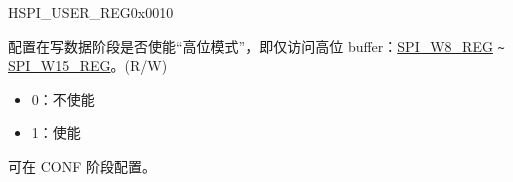 \begin{register}{H}{SPI\_USER\_REG}{0x0010}
\begin{regdesc}
\begin{reglist}
\label{fielddesc:SPIUSRMOSIHIGHPART}\item [SPI\_USR\_MOSI\_HIGHPART] 配置在写数据阶段是否使能“高位模式”，即仅访问高位 buffer：\hyperref[regdesc:SPIW0REG]{SPI\_W8\_REG} \verb+~+ \hyperref[regdesc:SPIW0REG]{SPI\_W15\_REG}。(R/W)\\
\begin{itemize}
    \item 0：不使能
    \item 1：使能
\end{itemize}
可在 CONF 阶段配置。 

\item [见下页]
\end{reglist}\end{regdesc}
\end{register}

\addtocounter{Regfloat}{-1}
